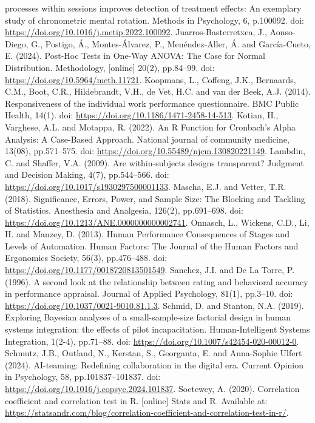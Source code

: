 \documentclass[
]{article}
\begin{document}
processes within sessions improves detection of treatment effects: An
exemplary study of chronometric mental rotation. Methods in Psychology,
6, p.100092. doi: \url{https://doi.org/10.1016/j.metip.2022.100092}.
Juarros-Basterretxea, J., Aonso-Diego, G., Postigo, Á., Montes-Álvarez,
P., Menéndez-Aller, Á. and García-Cueto, E. (2024). Post-Hoc Tests in
One-Way ANOVA: The Case for Normal Distribution. Methodology,
{[}online{]} 20(2), pp.84--99. doi:
\url{https://doi.org/10.5964/meth.11721}. Koopmans, L., Coffeng, J.K.,
Bernaards, C.M., Boot, C.R., Hildebrandt, V.H., de Vet, H.C. and van der
Beek, A.J. (2014). Responsiveness of the individual work performance
questionnaire. BMC Public Health, 14(1). doi:
\url{https://doi.org/10.1186/1471-2458-14-513}. Kotian, H., Varghese,
A.L. and Motappa, R. (2022). An R Function for Cronbach's Alpha
Analysis: A Case-Based Approach. National journal of community medicine,
13(08), pp.571--575. doi:
\url{https://doi.org/10.55489/njcm.130820221149}. Lambdin, C. and
Shaffer, V.A. (2009). Are within-subjects designs transparent? Judgment
and Decision Making, 4(7), pp.544--566. doi:
\url{https://doi.org/10.1017/s1930297500001133}. Mascha, E.J. and
Vetter, T.R. (2018). Significance, Errors, Power, and Sample Size: The
Blocking and Tackling of Statistics. Anesthesia and Analgesia, 126(2),
pp.691--698. doi: \url{https://doi.org/10.1213/ANE.0000000000002741}.
Onnasch, L., Wickens, C.D., Li, H. and Manzey, D. (2013). Human
Performance Consequences of Stages and Levels of Automation. Human
Factors: The Journal of the Human Factors and Ergonomics Society, 56(3),
pp.476--488. doi: \url{https://doi.org/10.1177/0018720813501549}.
Sanchez, J.I. and De La Torre, P. (1996). A second look at the
relationship between rating and behavioral accuracy in performance
appraisal. Journal of Applied Psychology, 81(1), pp.3--10. doi:
\url{https://doi.org/10.1037/0021-9010.81.1.3}. Schmid, D. and Stanton,
N.A. (2019). Exploring Bayesian analyses of a small-sample-size
factorial design in human systems integration: the effects of pilot
incapacitation. Human-Intelligent Systems Integration, 1(2-4),
pp.71--88. doi: \url{https://doi.org/10.1007/s42454-020-00012-0}.
Schmutz, J.B., Outland, N., Kerstan, S., Georganta, E. and Anna-Sophie
Ulfert (2024). AI-teaming: Redefining collaboration in the digital era.
Current Opinion in Psychology, 58, pp.101837--101837. doi:
\url{https://doi.org/10.1016/j.copsyc.2024.101837}. Soetewey, A. (2020).
Correlation coefficient and correlation test in R. {[}online{]} Stats
and R. Available at:
\url{https://statsandr.com/blog/correlation-coefficient-and-correlation-test-in-r/}.
\end{document}
